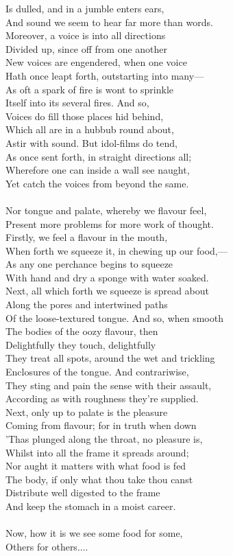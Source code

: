 Is dulled, and in a jumble enters ears,\\
And sound we seem to hear far more than words.\\
Moreover, a voice is into all directions\\
Divided up, since off from one another\\
New voices are engendered, when one voice\\
Hath once leapt forth, outstarting into many—\\
As oft a spark of fire is wont to sprinkle\\
Itself into its several fires. And so,\\
Voices do fill those places hid behind,\\
Which all are in a hubbub round about,\\
Astir with sound. But idol-films do tend,\\
As once sent forth, in straight directions all;\\
Wherefore one can inside a wall see naught,\\
Yet catch the voices from beyond the same.\\
\\
Nor tongue and palate, whereby we flavour feel,\\
Present more problems for more work of thought.\\
Firstly, we feel a flavour in the mouth,\\
When forth we squeeze it, in chewing up our food,—\\
As any one perchance begins to squeeze\\
With hand and dry a sponge with water soaked.\\
Next, all which forth we squeeze is spread about\\
Along the pores and intertwined paths\\
Of the loose-textured tongue. And so, when smooth\\
The bodies of the oozy flavour, then\\
Delightfully they touch, delightfully\\
They treat all spots, around the wet and trickling\\
Enclosures of the tongue. And contrariwise,\\
They sting and pain the sense with their assault,\\
According as with roughness they're supplied.\\
Next, only up to palate is the pleasure\\
Coming from flavour; for in truth when down\\
'Thas plunged along the throat, no pleasure is,\\
Whilst into all the frame it spreads around;\\
Nor aught it matters with what food is fed\\
The body, if only what thou take thou canst\\
Distribute well digested to the frame\\
And keep the stomach in a moist career.\\
\\
Now, how it is we see some food for some,\\
Others for others....

